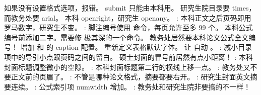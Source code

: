 \markdownRendererUlItem 如果没有设置格式选项，报错。\markdownRendererUlItemEnd 
\markdownRendererUlItem submit 只能由本科用。\markdownRendererUlItemEnd 
\markdownRendererUlItem 研究生院目录要 times，而教务处要 arial。\markdownRendererUlItemEnd 
\markdownRendererUlItem 本科 openright，研究生 openany。\markdownRendererUlItemEnd 
\markdownRendererUlItem {}: 本科正文之后页码即用罗马数字，研究生不变。\markdownRendererUlItemEnd 
\markdownRendererUlItem {}: 脚注编号使用  命令，每页允许至多 99 个。\markdownRendererUlItemEnd 
\markdownRendererUlItem 本科公式编号前添加二字。需要修  极其深的一个命令。\markdownRendererUlItemEnd 
\markdownRendererUlItem 教务处居然要本科论文公式全文编号！\markdownRendererUlItemEnd 
\markdownRendererUlItem 增加  和  的 caption 配置。\markdownRendererUlItemEnd 
\markdownRendererUlItem 重新定义表格默认字体。\markdownRendererUlItemEnd 
\markdownRendererUlItem 让  自动 。\markdownRendererUlItemEnd 
\markdownRendererUlItem {}: 减小目录项中的导引小点跟页码之间的留白。\markdownRendererUlItemEnd 
\markdownRendererUlItem 硕士封面的冒号前居然有点小距离！\markdownRendererUlItemEnd 
\markdownRendererUlItem {}: 本科封面标题调整微小的空隙。\markdownRendererUlItemEnd 
\markdownRendererUlItem {}: 本科封面标题第二行的横线上移一点。\markdownRendererUlItemEnd 
\markdownRendererUlItem {}: 教务处又不要正文前的页眉了。\markdownRendererUlItemEnd 
\markdownRendererUlItem {}: 不管是哪种论文格式，摘要都要右开。\markdownRendererUlItemEnd 
\markdownRendererUlItem {}: 研究生封面英文摘要连续。\markdownRendererUlItemEnd 
\markdownRendererUlItem {}: 公式索引项 numwidth 增加。\markdownRendererUlItemEnd 
\markdownRendererUlItem {}: 教务处和研究生院非要搞的不一样！\markdownRendererUlItemEnd 
